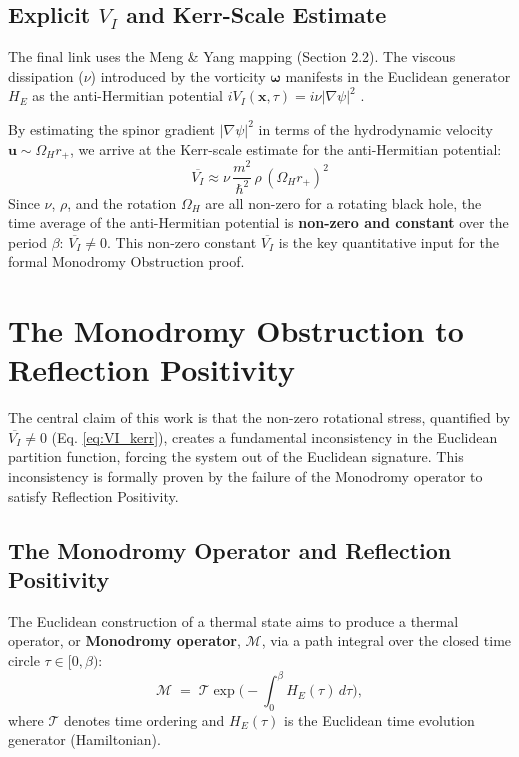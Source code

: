 \documentclass[11pt]{article}
\begin{document}
\subsection{Explicit $V_I$ and Kerr-Scale Estimate}

The final link uses the Meng \& Yang mapping (Section 2.2). The viscous dissipation ($\nu$) introduced by the vorticity $\mathbf{\omega}$ manifests in the Euclidean generator $H_E$ as the anti-Hermitian potential $iV_I(\mathbf{x}, \tau) = i\nu|\nabla\psi|^2$ \cite{Explicit VI and Kerr scaling.txt}.

By estimating the spinor gradient $|\nabla\psi|^2$ in terms of the hydrodynamic velocity $\mathbf{u} \sim \Omega_H r_+$, we arrive at the Kerr-scale estimate for the anti-Hermitian potential:
\begin{equation}\label{eq:VI_kerr}
    \overline{V_I} \approx \nu\,\frac{m^2}{\hbar^2}\,\rho\,(\Omega_H r_+)^2
\end{equation}
Since $\nu$, $\rho$, and the rotation $\Omega_H$ are all non-zero for a rotating black hole, the time average of the anti-Hermitian potential is \textbf{non-zero and constant} over the period $\beta$: $\overline{V_I} \neq 0$. This non-zero constant $\overline{V_I}$ is the key quantitative input for the formal Monodromy Obstruction proof.

\section{The Monodromy Obstruction to Reflection Positivity\cite{OsterwalderSchrader1973}}

The central claim of this work is that the non-zero rotational stress, quantified by $\overline{V_I} \neq 0$ (Eq. \ref{eq:VI_kerr}), creates a fundamental inconsistency in the Euclidean partition function, forcing the system out of the Euclidean signature. This inconsistency is formally proven by the failure of the Monodromy operator to satisfy Reflection Positivity\cite{OsterwalderSchrader1973}.

\subsection{The Monodromy Operator and Reflection Positivity\cite{OsterwalderSchrader1973}}

The Euclidean construction of a thermal state aims to produce a thermal operator, or \textbf{Monodromy operator}, $\mathcal{M}$, via a path integral over the closed time circle $\tau \in [0, \beta)$:
\begin{equation}\label{eq:monodromy_def}
    \mathcal M \;=\; \mathcal T\exp\Big(-\int_0^\beta H_E(\tau)\,d\tau\Big),
\end{equation}
where $\mathcal T$ denotes time ordering and $H_E(\tau)$ is the Euclidean time evolution generator (Hamiltonian).
\end{document}
